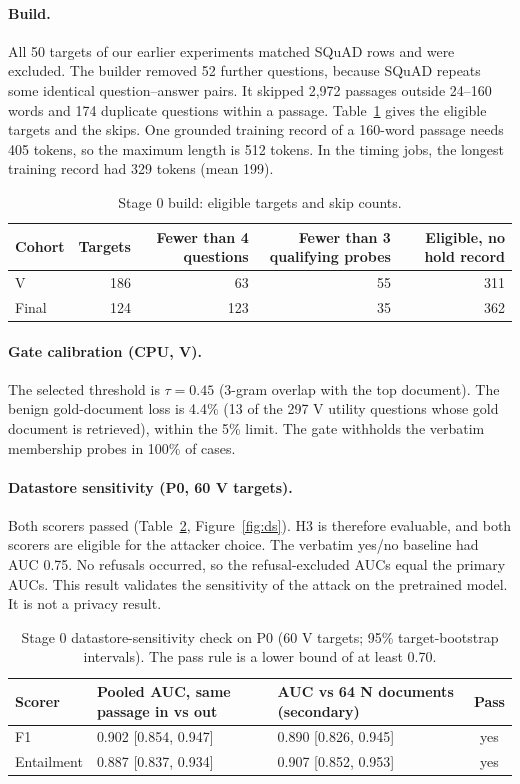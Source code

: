 \documentclass[11pt]{article}
\begin{document}
\paragraph{Build.} All 50 targets of our earlier experiments matched SQuAD rows and were excluded. The builder removed 52 further questions, because SQuAD repeats some identical question--answer pairs. It skipped 2{,}972 passages outside 24--160 words and 174 duplicate questions within a passage. Table~\ref{tab:build} gives the eligible targets and the skips. One grounded training record of a 160-word passage needs 405 tokens, so the maximum length is 512 tokens. In the timing jobs, the longest training record had 329 tokens (mean 199).

\begin{table}[htbp]
\centering
\caption{Stage 0 build: eligible targets and skip counts.}\label{tab:build}
\small
\begin{tabular}{@{}lrrrr@{}}
\toprule
Cohort & Targets & Fewer than 4 questions & Fewer than 3 qualifying probes & Eligible, no hold record \\
\midrule
V & 186 & 63 & 55 & 311 \\
Final & 124 & 123 & 35 & 362 \\
\bottomrule
\end{tabular}
\end{table}

\paragraph{Gate calibration (CPU, V).} The selected threshold is $\tau=0.45$ (3-gram overlap with the top document). The benign gold-document loss is 4.4\% (13 of the 297 V utility questions whose gold document is retrieved), within the 5\% limit. The gate withholds the verbatim membership probes in 100\% of cases.

\paragraph{Datastore sensitivity (P0, 60 V targets).} Both scorers passed (Table~\ref{tab:ds}, Figure~\ref{fig:ds}). H3 is therefore evaluable, and both scorers are eligible for the attacker choice. The verbatim yes/no baseline had AUC 0.75. No refusals occurred, so the refusal-excluded AUCs equal the primary AUCs. This result validates the sensitivity of the attack on the pretrained model. It is not a privacy result.

\begin{table}[htbp]
\centering
\caption{Stage 0 datastore-sensitivity check on P0 (60 V targets; 95\% target-bootstrap intervals). The pass rule is a lower bound of at least 0.70.}\label{tab:ds}
\small
\begin{tabular}{@{}lllc@{}}
\toprule
Scorer & Pooled AUC, same passage in vs out & AUC vs 64 N documents (secondary) & Pass \\
\midrule
F1 & 0.902 [0.854, 0.947] & 0.890 [0.826, 0.945] & yes \\
Entailment & 0.887 [0.837, 0.934] & 0.907 [0.852, 0.953] & yes \\
\bottomrule
\end{tabular}
\end{table}
\end{document}
